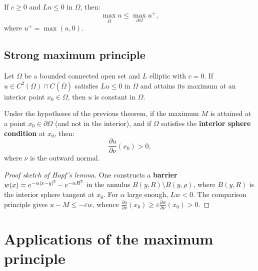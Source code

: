 \begin{theorem}
If $c \geq 0$ and $Lu \leq 0$ in $\Omega$, then:
\begin{equation}\label{eq:weak_max_c}
    \max_{\overline{\Omega}} u \leq \max_{\partial\Omega} u^+,
\end{equation}
where $u^+ = \max(u, 0)$.
\end{theorem}

\subsection{Strong maximum principle}

\begin{theorem}
\label{thm:strong_max}
Let $\Omega$ be a bounded connected open set and $L$ elliptic with $c = 0$.
If $u \in C^2(\Omega) \cap C(\overline{\Omega})$ satisfies $Lu \leq 0$
in $\Omega$ and attains its maximum at an interior point $x_0 \in \Omega$,
then $u$ is constant in $\Omega$.
\end{theorem}

\begin{theorem}
\label{thm:hopf_lemma}
Under the hypotheses of the previous theorem, if the maximum $M$ is
attained at a point $x_0 \in \partial\Omega$ (and not in the interior),
and if $\Omega$ satisfies the \textbf{interior sphere condition} at $x_0$,
then:
\begin{equation}\label{eq:hopf_lemma}
    \frac{\partial u}{\partial \nu}(x_0) > 0,
\end{equation}
where $\nu$ is the outward normal.
\end{theorem}

\begin{proof}[Proof sketch of Hopf's lemma]
One constructs a \textbf{barrier} $w(x) = e^{-\alpha\left| x-y \right|^2} - e^{-\alpha R^2}$
in the annulus $B(y,R) \setminus B(y,\rho)$, where $B(y,R)$ is the interior
sphere tangent at $x_0$. For $\alpha$ large enough, $Lw < 0$. The comparison
principle gives $u - M \leq -\varepsilon w$, whence
$\frac{\partial u}{\partial \nu}(x_0) \geq \varepsilon \frac{\partial w}{\partial \nu}(x_0) > 0$.
\end{proof}

\section{Applications of the maximum principle}

